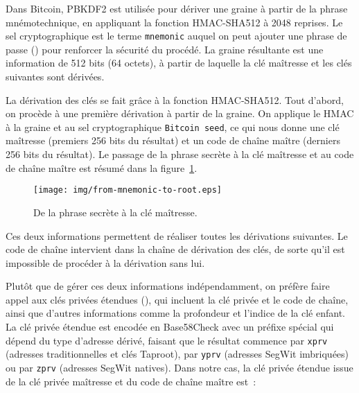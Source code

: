 Dans Bitcoin, PBKDF2 est utilisée pour dériver une graine à partir de la phrase mnémotechnique, en appliquant la fonction HMAC-SHA512 à 2048 reprises. Le sel cryptographique est le terme \texttt{mnemonic} auquel on peut ajouter une phrase de passe () pour renforcer la sécurité du procédé. La graine résultante est une information de 512 bits (64 octets), à partir de laquelle la clé maîtresse et les clés suivantes sont dérivées.


La dérivation des clés se fait grâce à la fonction HMAC-SHA512. Tout d'abord, on procède à une première dérivation à partir de la graine. On applique le HMAC à la graine et au sel cryptographique \texttt{Bitcoin seed}, ce qui nous donne une clé maîtresse (premiers 256 bits du résultat) et un code de chaîne maître (derniers 256 bits du résultat). Le passage de la phrase secrète à la clé maîtresse et au code de chaîne maître est résumé dans la figure~\ref{fig:from-mnemonic-to-root}.

\begin{figure}[h]
  \centering
  \texttt{[image: img/from-mnemonic-to-root.eps]}
  \caption{De la phrase secrète à la clé maîtresse.}
  \label{fig:from-mnemonic-to-root}
\end{figure}


Ces deux informations permettent de réaliser toutes les dérivations suivantes. Le code de chaîne intervient dans la chaîne de dérivation des clés, de sorte qu'il est impossible de procéder à la dérivation sans lui.

Plutôt que de gérer ces deux informations indépendamment, on préfère faire appel aux clés privées étendues (), qui incluent la clé privée et le code de chaîne, ainsi que d'autres informations comme la profondeur et l'indice de la clé enfant. La clé privée étendue est encodée en Base58Check avec un préfixe spécial qui dépend du type d'adresse dérivé, faisant que le résultat commence par \texttt{xprv} (adresses traditionnelles et clés Taproot), par \texttt{yprv} (adresses SegWit imbriquées) ou par \texttt{zprv} (adresses SegWit natives). Dans notre cas, la clé privée étendue issue de la clé privée maîtresse et du code de chaîne maître est~:


